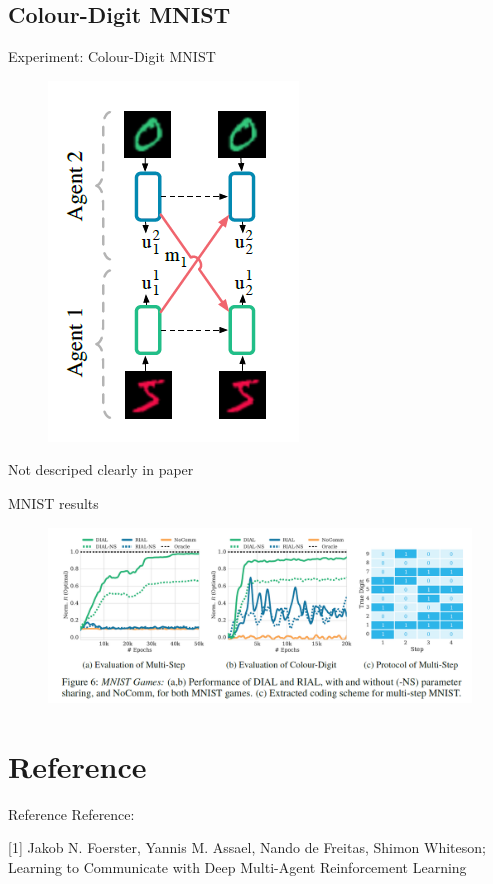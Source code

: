 \documentclass[mathserif]{beamer}
\begin{document}
\subsection{Colour-Digit MNIST}
\begin{frame}{Experiment: Colour-Digit MNIST}
  \begin{figure}
    \centering
    \includegraphics[scale=0.8]{fig/7}
  \end{figure}
  Not descriped clearly in paper
\end{frame}
\begin{frame}{MNIST results}
  \begin{figure}
    \centering
    \includegraphics[scale=0.4]{fig/9}
  \end{figure}
\end{frame}
\section{Reference}
\begin{frame}{Reference}
  Reference:

  [1] Jakob N. Foerster, Yannis M. Assael, Nando de Freitas, Shimon Whiteson; Learning to Communicate with Deep Multi-Agent Reinforcement Learning
\end{frame}
\end{document}
